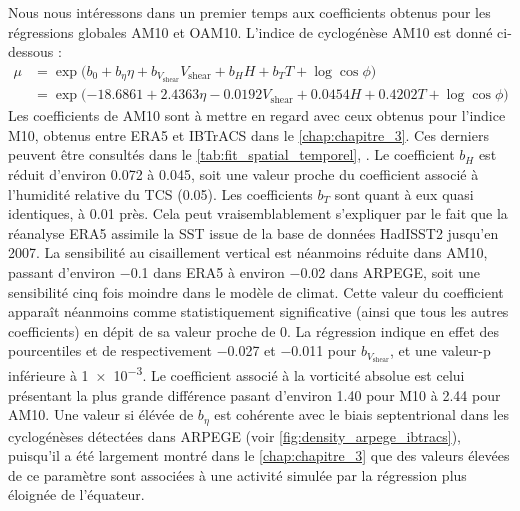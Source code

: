 \documentclass[../main.tex]{subfiles}
\begin{document}
Nous nous intéressons dans un premier temps aux coefficients obtenus pour les régressions globales AM10 et OAM10. L'indice de cyclogénèse AM10 est donné
ci-dessous :
%
\begin{align*}
\tag{AM10}
    \mu &= \exp \big( b_0 + b_\eta \eta + b_{V_{\mathrm{shear}}} V_{\mathrm{shear}} + b_H H + b_T T + \log \cos \phi \big)\\
        &= \exp \big( \num{-18.6861} + \num{2.4363} \eta - \num{0.0192} V_{\mathrm{shear}} + \num{0.0454} H + \num{0.4202} T + \log \cos \phi \big)
\end{align*}
%
Les coefficients de AM10 sont à mettre en regard avec ceux obtenus pour l'indice M10, obtenus entre ERA5 et IBTrACS dans le \cref{chap:chapitre_3}. Ces derniers
peuvent être consultés dans le \cref{tab:fit_spatial_temporel}, . Le coefficient $b_H$ est réduit d'environ \num{0.072} à
\num{0.045}, soit une valeur proche du coefficient associé à l'humidité relative du TCS (\num{0.05}). Les coefficients $b_T$ sont quant à eux quasi identiques,
à \num{0.01} près. Cela peut vraisemblablement s'expliquer par le fait que la réanalyse ERA5 assimile la SST issue de la base de données HadISST2
jusqu'en \num{2007}. La sensibilité au cisaillement vertical est néanmoins réduite dans AM10, passant d'environ \num{-0.1} dans ERA5 à environ \num{-0.02} dans
ARPEGE, soit une sensibilité cinq fois moindre dans le modèle de climat. Cette valeur du coefficient apparaît néanmoins comme statistiquement significative
(ainsi que tous les autres coefficients) en dépit de sa valeur proche de \num{0}. La régression indique en effet des pourcentiles  et  de
respectivement \num{-0.027} et \num{-0.011} pour $b_{V_{\mathrm{shear}}}$, et une valeur-p inférieure à \num{1e-3}. Le coefficient associé à la vorticité
absolue est celui présentant la plus grande différence pasant d'environ \num{1.40} pour M10 à \num{2.44} pour AM10. Une valeur si élévée de $b_\eta$ est
cohérente avec le biais septentrional dans les cyclogénèses détectées dans ARPEGE (voir \cref{fig:density_arpege_ibtracs}), puisqu'il a été largement montré
dans le \cref{chap:chapitre_3} que des valeurs élevées de ce paramètre sont associées à une activité simulée par la régression plus éloignée de l'équateur.
\end{document}
